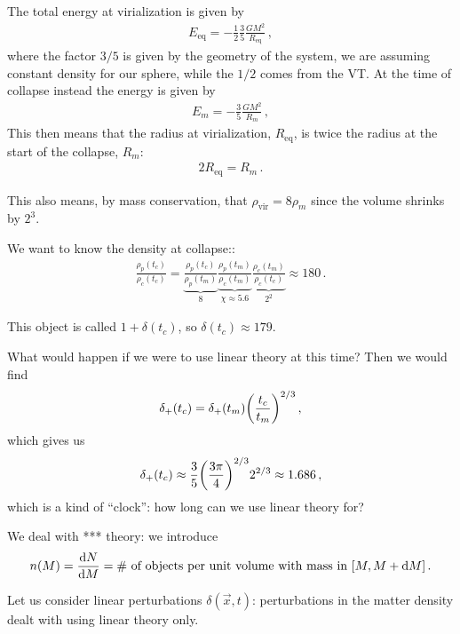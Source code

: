 \documentclass[main.tex]{subfiles}
\begin{document}
The total energy at virialization is given by 
%
\begin{align}
E _{\text{eq}} = - \frac{1}{2} \frac{3}{5} \frac{GM^2}{R _{\text{eq}}}
\,,
\end{align}
%
where the factor \(3/5\) is given by the geometry of the system, we are assuming constant density for our sphere, while the \(1/2\) comes from the VT.  
At the time of collapse instead the energy is given by 
%
\begin{align}
E_m =- \frac{3}{5} \frac{GM^2}{R_m}
\,,
\end{align}
%
This then means that the radius at virialization, \(R _{\text{eq}}\), is twice the radius at the start of the collapse, \(R_m\): 
%
\begin{align}
2 R _{\text{eq}} = R_{m}
\,.
\end{align}

This also means, by mass conservation, that \(\rho _{\text{vir}} = 8 \rho_{m}\) since the volume shrinks by \(2^{3}\). 

We want to know the density at collapse:: 
%
\begin{align}
\frac{\rho_{p}(t_c)}{\rho_{c}(t_c)} = \underbrace{\frac{\rho_{p}(t_c)}{\rho_{p}(t_m)}}_{8} \underbrace{\frac{\rho_{p}(t_m)}{\rho_{c}(t_m)}}_{\chi \approx 5.6} \underbrace{\frac{\rho_{c}(t_m)}{\rho_{c} (t_c)}}_{2^2}
\approx 180
\,.
\end{align}

This object is called \(1 + \delta(t_c) \), so \(\delta (t_c) \approx 179\). 

What would happen if we were to use linear theory at this time? Then we would find 
%
\begin{align}
\delta_{+} (t_c) = \delta_{+}(t_m) \qty(\frac{t_c}{t_m})^{2/3}
\,,
\end{align}
%
which gives us
%
\begin{align}
\delta_+ (t_c) \approx \frac{3}{5} \qty(\frac{3 \pi }{4})^{2/3} 2^{2/3} \approx 1.686 
\,,
\end{align}
%
which is a kind of ``clock'': how long can we use linear theory for? 

We deal with *** theory: we introduce 
%
\begin{align}
n(M) = \dv{N}{M} = \text{\# of objects per unit volume with mass in } [M, M + \dd{M}]
\,.
\end{align}

Let us consider linear perturbations \(\delta(\vec{x}, t)\): perturbations in the matter density dealt with using linear theory only. 
\end{document}
